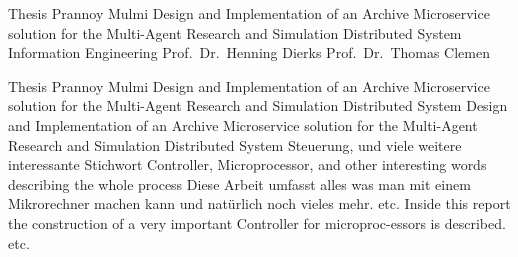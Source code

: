 



													{ Thesis }																			%
													{Prannoy Mulmi}														%
													{Design and Implementation of an Archive Microservice solution for the Multi-Agent Research and
													Simulation Distributed System}											  %
													{Information Engineering}						%
													{Prof.\ Dr.\ Henning Dierks}					%
													{Prof.\ Dr.\ Thomas Clemen}								%
													

													{ Thesis }																			%
													{Prannoy Mulmi}														%
													{Design and Implementation of an Archive Microservice solution for the Multi-Agent Research and
													Simulation Distributed System}											  %
													{Design and Implementation of an Archive Microservice solution for the Multi-Agent Research and
													Simulation Distributed System}							%
													{Steuerung, und viele weitere interessante 
													Stichwort}																		%
													{Controller, Microprocessor, and other 
													interesting words describing the whole 
													process}																			%
													{Diese Arbeit umfasst alles was man mit einem 
													Mikrorechner machen kann und nat\"urlich noch vieles mehr.
													etc.}																					%
													{Inside this report the construction of a very 
													important Controller for microproc-essors is 
													described.												
													etc.}																			%

